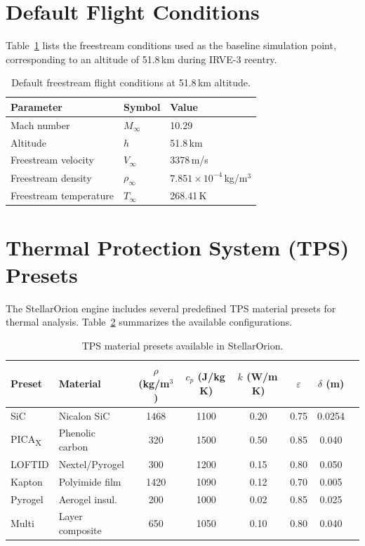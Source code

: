 \section{Default Flight Conditions}
\label{sec:flight_conditions}

Table~\ref{tab:flight} lists the freestream conditions used as the baseline simulation point, corresponding to an altitude of 51.8\,km during IRVE-3 reentry.

\begin{table}[H]
\centering
\caption{Default freestream flight conditions at 51.8\,km altitude.}
\label{tab:flight}
\begin{tabular}{lll}
\hline
\textbf{Parameter} & \textbf{Symbol} & \textbf{Value} \\
\hline
Mach number & $M_\infty$ & 10.29 \\
Altitude & $h$ & 51.8\,km \\
Freestream velocity & $V_\infty$ & 3378\,m/s \\
Freestream density & $\rho_\infty$ & $7.851 \times 10^{-4}$\,kg/m$^3$ \\
Freestream temperature & $T_\infty$ & 268.41\,K \\
\hline
\end{tabular}
\end{table}

\section{Thermal Protection System (TPS) Presets}
\label{sec:tps_presets}

The StellarOrion engine includes several predefined TPS material presets for thermal analysis. Table~\ref{tab:tps} summarizes the available configurations.

\begin{table}[H]
\centering
\caption{TPS material presets available in StellarOrion.}
\label{tab:tps}
\begin{tabularx}{\textwidth}{l l c c c c c X}
\hline
\textbf{Preset} & \textbf{Material} & $\rho$ (kg/m$^3$) & $c_p$ (J/kg\,K) & $k$ (W/m\,K) & $\varepsilon$ & $\delta$ (m) \\
\hline
SiC & Nicalon SiC & 1468 & 1100 & 0.20 & 0.75 & 0.0254 \\
PICA\textsubscript{X} & Phenolic carbon & 320 & 1500 & 0.50 & 0.85 & 0.040 \\
LOFTID & Nextel/Pyrogel & 300 & 1200 & 0.15 & 0.80 & 0.050 \\
Kapton & Polyimide film & 1420 & 1090 & 0.12 & 0.70 & 0.005 \\
Pyrogel & Aerogel insul.\ & 200 & 1000 & 0.02 & 0.85 & 0.025 \\
Multi & Layer composite & 650 & 1050 & 0.10 & 0.80 & 0.040 \\
\hline
\end{tabularx}
\end{table}

